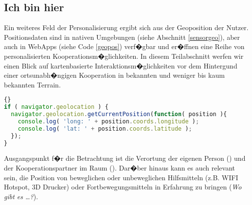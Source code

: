 \begin{comment}
- unterst�tzen menschliche Kognition
- �bernehmen kognitive Aufgaben (=> stille Kollaborateure)
- Siehe https://youtu.be/EsU01gc9bAk?t=41m14s
- Zwei Fragen
-- Informations Design: Welche Informationen soll die kognitive Schnittstelle aus der Umwelt selegieren? Wie sollen die Informationen dargestellt werden? => Multiple Repr�sentationen, Awareness Technologien, Nutzung kognitiver Konflikte, 

-- Interaktion Design: Welche Handlungsm�glichkeiten sollen Individuen einger�umt werden? Wie kann die kognitive Schnittstelle adaptiv auf Nutzer reagieren? => intuitive Interaktion, Explorationsgelegenheiten, Unterst�tzung kooperativen Arbeitens

- Augmented Working Memory. �hnliche Handlungsm�glichkeiten wie im Arbeitsged�chtnis. 
\end{comment}



\subsection{Ich bin hier}%
Ein weiteres Feld der Personalisierung ergibt sich aus der Geoposition der Nutzer. Positionsdaten sind in nativen Umgebungen (siehe Abschnitt \ref{sensorgeo}), aber auch in WebApps (siehe Code \ref{geopos}) verf�gbar und er�ffnen eine Reihe von personalisierten Kooperationsm�glichkeiten. In diesem Teilabschnitt werfen wir einen Blick auf kartenbasierte Interaktionsm�glichkeiten vor dem Hintergund einer ortsunabh�ngigen Kooperation in bekannten und weniger bis kaum bekannten Terrain. 

\begin{lstlisting}[caption={Ermittlung der Geoposition mit Hilfe von Javscript im Webbrowser},label={server-code},language=Javascript,firstnumber=1,label=geopos]{}
if ( navigator.geolocation ) {
  navigator.geolocation.getCurrentPosition(function( position ){
    console.log( 'long: ' + position.coords.longitude );
    console.log( 'lat: ' + position.coords.latitude );
  });
} 
\end{lstlisting}

Ausgangspunkt f�r die Betrachtung ist die Verortung der eigenen Person () und der Kooperationspartner im Raum (). Dar�ber hinaus kann es auch relevant sein, die Position von beweglichen oder unbeweglichen Hilfsmitteln (z.B. WIFI Hotspot, 3D Drucker) oder Fortbewegungsmitteln in Erfahrung zu bringen (\textit{Wo gibt es \dots?}). 



